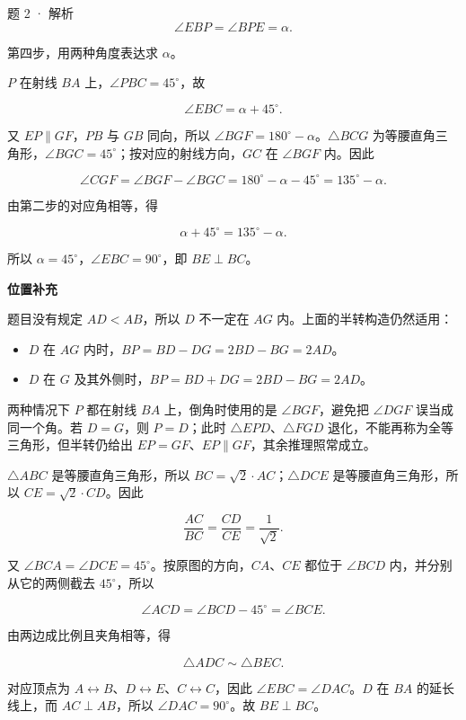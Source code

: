 \begin{solution}{题 2 · 解析}
\[
\angle EBP=\angle BPE=\alpha.
\]

第四步，用两种角度表达求 \(\alpha \)。

\(P\) 在射线 \(BA\) 上，\(\angle PBC=45^\circ\)，故

\[
\angle EBC=\alpha+45^\circ.
\]

又 \(EP\parallel GF\)，\(PB\) 与 \(GB\) 同向，所以 \(\angle BGF=180^\circ-\alpha \)。\(\triangle BCG\) 为等腰直角三角形，\(\angle BGC=45^\circ\)；按对应的射线方向，\(GC\) 在 \(\angle BGF\) 内。因此

\[
\angle CGF
=\angle BGF-\angle BGC
=180^\circ-\alpha-45^\circ
=135^\circ-\alpha.
\]

由第二步的对应角相等，得

\[
\alpha+45^\circ=135^\circ-\alpha.
\]

所以 \(\alpha =45^\circ\)，\(\angle EBC=90^\circ\)，即 \(BE\perp BC\)。

\textbf{位置补充}

题目没有规定 \(AD<AB\)，所以 \(D\) 不一定在 \(AG\) 内。上面的半转构造仍然适用：

\begin{itemize}
\item \(D\) 在 \(AG\) 内时，\(BP=BD-DG=2BD-BG=2AD\)。
\item \(D\) 在 \(G\) 及其外侧时，\(BP=BD+DG=2BD-BG=2AD\)。
\end{itemize}

两种情况下 \(P\) 都在射线 \(BA\) 上，倒角时使用的是 \(\angle BGF\)，避免把 \(\angle DGF\) 误当成同一个角。若 \(D=G\)，则 \(P=D\)；此时 \(\triangle EPD\)、\(\triangle FGD\) 退化，不能再称为全等三角形，但半转仍给出 \(EP=GF\)、\(EP\parallel GF\)，其余推理照常成立。


\solve

\(\triangle ABC\) 是等腰直角三角形，所以 \(BC=\sqrt{2}\cdot AC\)；\(\triangle DCE\) 是等腰直角三角形，所以 \(CE=\sqrt{2}\cdot CD\)。因此

\[
\frac{AC}{BC}=\frac{CD}{CE}=\frac1{\sqrt2}.
\]

又 \(\angle BCA=\angle DCE=45^\circ\)。按原图的方向，\(CA\)、\(CE\) 都位于 \(\angle BCD\) 内，并分别从它的两侧截去 \(45^\circ\)，所以

\[
\angle ACD=\angle BCD-45^\circ
=\angle BCE.
\]

由两边成比例且夹角相等，得

\[
\triangle ADC\sim\triangle BEC.
\]

对应顶点为 \(A\leftrightarrow B\)、\(D\leftrightarrow E\)、\(C\leftrightarrow C\)，因此 \(\angle EBC=\angle DAC\)。\(D\) 在 \(BA\) 的延长线上，而 \(AC\perp AB\)，所以 \(\angle DAC=90^\circ\)。故 \(BE\perp BC\)。


\end{solution}
